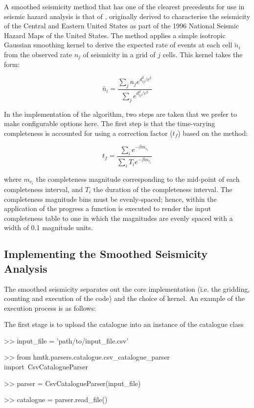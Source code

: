 A smoothed seismicity method that has one of the clearest precedents for use in seismic hazard analysis is that of \textcite{frankel1995}, originally derived to characterise the seismicity of the Central and Eastern United States as part of the 1996 National Seismic Hazard Maps of the United States. The method applies a simple isotropic Gaussian smoothing kernel to derive the expected rate of events at each cell $\tilde{n}_i$ from the observed rate $n_j$ of seismicity in a grid of $j$ cells. This kernel takes the form:

\begin{equation}
\tilde{n_i} = \frac{\sum_j n_j e^{d_{ij}^2 / c^2}}{\sum_j e^{d_{ij}^2 / c^2}} 
\end{equation}

In the implementation of the algorithm, two steps are taken that we prefer to make configurable options here. The first step is that the time-varying completeness is accounted for using a correction factor ($t_f$) based on the \textcite{Weichert1980} method:

 \begin{equation}
 t_f = \frac{\sum_i e^{-\beta m_{c_i}}}{\sum_i T_i e^{-\beta m_{c_i}}} 
 \end{equation}
 
where $m_{c_i}$ the completeness magnitude corresponding to the mid-point of each completeness interval, and $T_i$ the duration of the completeness interval. The completeness magnitude bins must be evenly-spaced; hence, within the application of the progress a function is executed to render the input completeness table to one in which the magnitudes are evenly spaced with a width of 0.1 magnitude units. 

\subsection{Implementing the Smoothed Seismicity Analysis}

The smoothed seismicity separates out the core implementation (i.e. the gridding, counting and execution of the code) and the choice of kernel. An example of the execution process is as follows:

The first stage is to upload the catalogue into an instance of the catalogue class

\begin{python}[frame=single]
>> input_file = 'path/to/input_file.csv'

>> from hmtk.parsers.catalogue.csv_catalogue_parser import\
    CsvCatalogueParser

>> parser = CsvCatalogueParser(input_file)

>> catalogue = parser.read_file()
\end{python}

